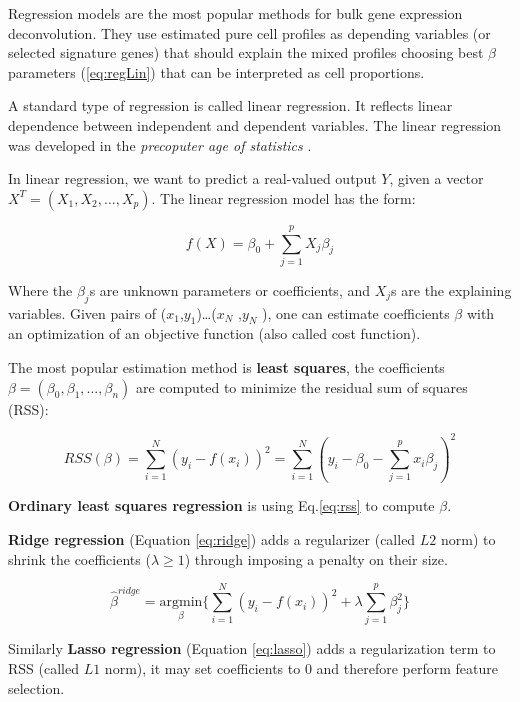 \documentclass[12pt,]{book}
\theoremstyle{definition}
\theoremstyle{definition}
\theoremstyle{definition}
\theoremstyle{remark}
\begin{document}
Regression models are the most popular methods for bulk gene expression
deconvolution. They use estimated pure cell profiles as depending
variables (or selected signature genes) that should explain the mixed
profiles choosing best \(\beta\) parameters (\eqref{eq:regLin}) that can
be interpreted as cell proportions.

A standard type of regression is called linear regression. It reflects
linear dependence between independent and dependent variables. The
linear regression was developed in the \emph{precoputer age of
statistics} \citep{Hastie2009}.

In linear regression, we want to predict a real-valued output \(Y\),
given a vector \(X^T = (X_1,X_2,… ,X_p)\). The linear regression model
has the form:

\begin{equation}
f(X) = \beta_0 + \sum_{j=1}^{p} X_j\beta_j \label{eq:regLin}
\end{equation}

Where the \(\beta_j\)s are unknown parameters or coefficients, and
\(X_j\)s are the explaining variables. Given pairs of
(\(x_1\),\(y_1\))\ldots{}(\(x_N\) ,\(y_N\) ), one can estimate
coefficients \(\beta\) with an optimization of an objective function
(also called cost function).

The most popular estimation method is \textbf{least squares}, the
coefficients \(\beta = (\beta_0, \beta_1, ..., \beta_n)\) are computed
to minimize the residual sum of squares (RSS):

\begin{equation}
RSS(\beta) = \sum_{i = 1}^{N}(y_i - f(x_i))^2 = \sum_{i = 1}^{N}(y_i - \beta_0 - \sum_{j=1}^p x_i\beta_j)^2 \label{eq:rss}
\end{equation}

\textbf{Ordinary least squares regression} is using Eq.\eqref{eq:rss} to
compute \(\beta\).

\textbf{Ridge regression} (Equation \eqref{eq:ridge}) adds a regularizer
(called \(L2\) norm) to shrink the coefficients (\(\lambda \geq 1\))
through imposing a penalty on their size.

\begin{equation}
\hat{\beta}^{ridge} = \underset{\beta}{\text{argmin}}\{\sum_{i = 1}^{N}(y_i - f(x_i))^2 + \lambda\sum_{j=1}^{p}\beta^2_j\}\label{eq:ridge}
\end{equation}

Similarly \textbf{Lasso regression} (Equation \eqref{eq:lasso}) adds a
regularization term to RSS (called \(L1\) norm), it may set coefficients
to 0 and therefore perform feature selection.
\end{document}
